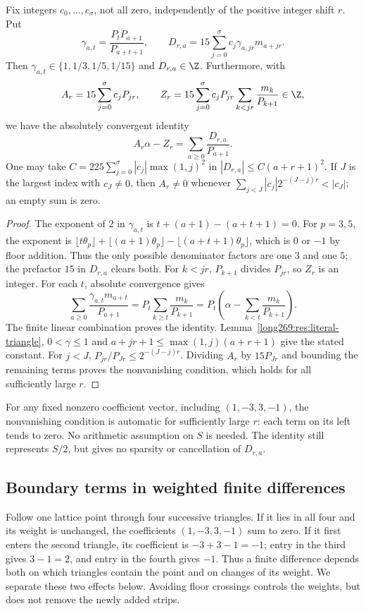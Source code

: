 \begin{lemma}
\label{long269:res:weighted-shift-identity}
Fix integers $c_0,\ldots,c_\sigma$, not all zero, independently of the
positive integer shift $r$.  Put
\[
 \gamma_{a,t}=\frac{P_tP_{a+1}}{P_{a+t+1}},\qquad
 D_{r,a}=15\sum_{j=0}^{\sigma}c_j\gamma_{a,jr}m_{a+jr}.
\]
Then $\gamma_{a,t}\in\{1,1/3,1/5,1/15\}$ and $D_{r,a}\in\Z$.
Furthermore, with
\[
 A_r=15\sum_{j=0}^{\sigma}c_jP_{jr},\qquad
 Z_r=15\sum_{j=0}^{\sigma}c_jP_{jr}
       \sum_{k<jr}\frac{m_k}{P_{k+1}}\in\Z,
\]
we have the absolutely convergent identity
\begin{equation}\label{long269:eq:weighted-shift-identity}
 A_r\alpha-Z_r=\sum_{a\ge0}\frac{D_{r,a}}{P_{a+1}}.
\end{equation}
One may take
$C=225\sum_{j=0}^{\sigma}|c_j|\max(1,j)^2$ in
$|D_{r,a}|\le C(a+r+1)^2$.  If $J$ is the largest index with $c_J\ne0$,
then $A_r\ne0$ whenever
$\sum_{j<J}|c_j|2^{-(J-j)r}<|c_J|$; an empty sum is zero.
\end{lemma}
\begin{proof}
The exponent of $2$ in $\gamma_{a,t}$ is $t+(a+1)-(a+t+1)=0$.
For $p=3,5$, the exponent is
$\lfloor t\theta_p\rfloor+\lfloor(a+1)\theta_p\rfloor
-\lfloor(a+t+1)\theta_p\rfloor$, which is $0$ or $-1$ by floor addition.
Thus the only possible denominator factors are one $3$ and one $5$;
the prefactor $15$ in $D_{r,a}$ clears both.
For $k<jr$, $P_{k+1}$ divides $P_{jr}$, so $Z_r$ is an integer.
For each $t$, absolute convergence gives
\[
 \sum_{a\ge0}\frac{\gamma_{a,t}m_{a+t}}{P_{a+1}}
 =P_t\sum_{k\ge t}\frac{m_k}{P_{k+1}}
 =P_t\left(\alpha-\sum_{k<t}\frac{m_k}{P_{k+1}}\right).
\]
The finite linear combination proves the identity.
Lemma~\ref{long269:res:literal-triangle}, $0<\gamma\le1$ and
$a+jr+1\le\max(1,j)(a+r+1)$ give the stated constant.
For $j<J$, $P_{jr}/P_{Jr}\le2^{-(J-j)r}$.  Dividing $A_r$ by
$15P_{Jr}$ and bounding the remaining terms proves the nonvanishing
condition, which holds for all sufficiently large $r$.
\end{proof}
For any fixed nonzero coefficient vector, including $(1,-3,3,-1)$,
the nonvanishing condition is automatic for sufficiently large $r$:
each term on its left tends to zero.  No arithmetic assumption on $S$ is
needed.  The identity still represents $S/2$, but gives no sparsity or
cancellation of $D_{r,a}$.

\subsection{Boundary terms in weighted finite differences}
\label{long269:sec:boundary-difference}
Follow one lattice point through four successive triangles. If it lies
in all four and its weight is unchanged, the coefficients $(1,-3,3,-1)$
sum to zero. If it first enters the second triangle, its coefficient is
$-3+3-1=-1$; entry in the third gives $3-1=2$, and entry in the fourth
gives $-1$. Thus a finite difference depends both on which triangles
contain the point and on changes of its weight. We separate these two
effects below. Avoiding floor crossings controls the weights, but does
not remove the newly added strips.

